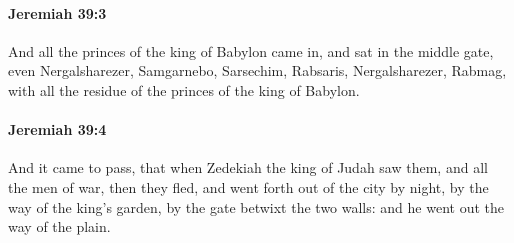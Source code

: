 		\paragraph{Jeremiah 39:3} %
			\label{JEREMIAH-39-3}

			And all the princes of the king of Babylon came in, and sat in the middle gate, even Nergalsharezer, Samgarnebo, Sarsechim, Rabsaris, Nergalsharezer, Rabmag, with all the residue of the princes of the king of Babylon.


		\paragraph{Jeremiah 39:4} %
			\label{JEREMIAH-39-4}

			And it came to pass, that when Zedekiah the king of Judah saw them, and all the men of war, then they fled, and went forth out of the city by night, by the way of the king’s garden, by the gate betwixt the two walls: and he went out the way of the plain.

